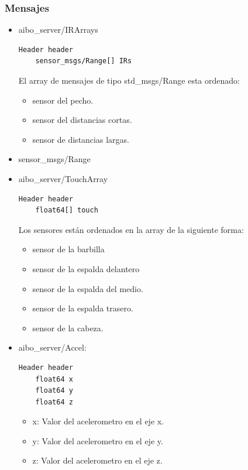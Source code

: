 \documentclass[12pt,a4paper,final,twoside]{book}
\begin{document}
\subsubsection{Mensajes}
\begin{itemize}
\item aibo{\_}server/IRArrays

\begin{lstlisting}[language=bash]
	Header header
	sensor_msgs/Range[] IRs
\end{lstlisting}

El array de mensajes de tipo std{\_}msgs/Range esta ordenado:
\begin{itemize}
\item sensor del pecho.
\item sensor del distancias cortas.
\item sensor de distancias largas.
\end{itemize}

\item sensor{\_}msgs/Range

\item aibo{\_}server/TouchArray

\begin{lstlisting}[language=bash]
	Header header
	float64[] touch
\end{lstlisting}


Los sensores están ordenados en la array de la siguiente forma:

\begin{itemize}
\item sensor de la barbilla
\item sensor de la espalda delantero
\item sensor de la espalda del medio.
\item sensor de la espalda trasero.
\item sensor de la cabeza.
\end{itemize} 

\item aibo{\_}server/Accel:

\begin{lstlisting}[language=bash]
	Header header
	float64 x
	float64 y
	float64 z
\end{lstlisting}
\begin{itemize}
\item x: Valor del acelerometro en el eje x.
\item y: Valor del acelerometro en el eje y.
\item z: Valor del acelerometro en el eje z.
\end{itemize}


\end{itemize}
\end{document}
